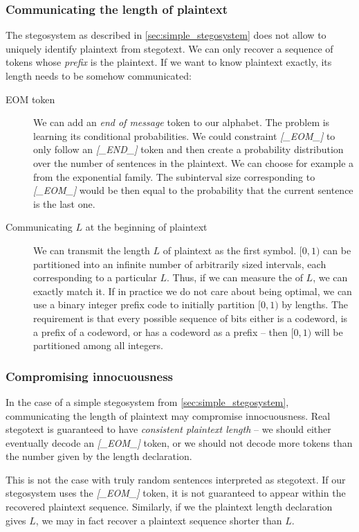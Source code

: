 \documentclass[draft]{IIBproject}
\makeatletter
\DeclareRobustCommand*{\AbbreviationWithDot}[1]{\@ifnextchar{.}{#1}{#1.\@\xspace}}
\DeclareRobustCommand*{\pmf}{\AbbreviationWithDot{p.m.f}}
\DeclareRobustCommand{\ngram}[1]{\emph{[#1]}}
\makeatother
\begin{document}
\subsubsection{Communicating the length of plaintext}

The stegosystem as described in \cref{sec:simple_stegosystem} does not allow to uniquely identify plaintext from stegotext. We can only recover a sequence of tokens whose \emph{prefix} is the plaintext. If we want to know plaintext exactly, its length needs to be somehow communicated:

\begin{description}
	\item[EOM token] We can add an \emph{end of message} token to our alphabet. The problem is learning its conditional probabilities. We could constraint \ngram{\_EOM\_} to only follow an \ngram{\_END\_} token and then create a probability distribution over the number of sentences in the plaintext. We can choose for example a \pmf from the exponential family. The subinterval size corresponding to \ngram{\_EOM\_} would be then equal to the probability that the current sentence is the last one.
	\item[Communicating $L$ at the beginning of plaintext] We can transmit the length $L$ of plaintext as the first symbol. $[0,1)$ can be partitioned into an infinite number of arbitrarily sized intervals, each corresponding to a particular $L$. Thus, if we can measure the \pmf of $L$, we can exactly match it. If in practice we do not care about being optimal, we can use a binary integer prefix code to initially partition $[0,1)$ by lengths. The requirement is that every possible sequence of bits either is a codeword, is a prefix of a codeword, or has a codeword as a prefix -- then $[0,1)$ will be partitioned among all integers.
\end{description}

\subsubsection{Compromising innocuousness}

In the case of a simple stegosystem from \cref{sec:simple_stegosystem}, communicating the length of plaintext may compromise innocuousness. Real stegotext is guaranteed to have \emph{consistent plaintext length} -- we should either eventually decode an \ngram{\_EOM\_} token, or we should not decode more tokens than the number given by the length declaration.

This is not the case with truly random sentences interpreted as stegotext. If our stegosystem uses the \ngram{\_EOM\_} token, it is not guaranteed to appear within the recovered plaintext sequence. Similarly, if we the plaintext length declaration gives $L$, we may in fact recover a plaintext sequence shorter than $L$.
\end{document}
